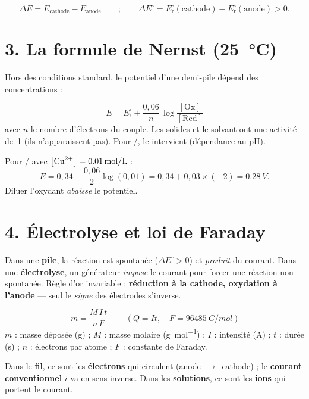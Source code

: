 \documentclass[11pt,a4paper]{article}
\newcommand{\Ered}{\ensuremath{E_{\mathrm{r}}^{\circ}}}
\newcommand{\fem}{\ensuremath{\Delta E}}
\newcommand{\cc}[1]{\left[#1\right]}
\begin{document}
\begin{formule}
\[
\fem = E_{\text{cathode}} - E_{\text{anode}} \qquad ; \qquad
\fem^{\circ} = \Ered(\text{cathode}) - \Ered(\text{anode}) > 0.
\]
\end{formule}

\section*{3. La formule de Nernst (\SI{25}{\celsius})}
Hors des conditions standard, le potentiel d'une demi-pile dépend des concentrations :
\begin{formule}
\[
E = \Ered + \frac{0{,}06}{n}\,\log\frac{[\mathrm{Ox}]}{[\mathrm{Red}]}
\]
avec $n$ le nombre d'électrons du couple. Les solides et le solvant ont une activité de~1
(ils n'apparaissent pas). Pour /, le  intervient (dépendance au pH).
\end{formule}

\begin{exemple}
Pour / avec $\cc{\ce{Cu^{2+}}}=\SI{0.01}{mol\per\litre}$ :
\[
E = 0{,}34 + \frac{0{,}06}{2}\log(0{,}01) = 0{,}34 + 0{,}03\times(-2) = \SI{0.28}{V}.
\]
Diluer l'oxydant \emph{abaisse} le potentiel.
\end{exemple}

\section*{4. Électrolyse et loi de Faraday}
\begin{regle}
Dans une \textbf{pile}, la réaction est spontanée ($\fem^{\circ}>0$) et \emph{produit} du courant.
Dans une \textbf{électrolyse}, un générateur \emph{impose} le courant pour forcer une réaction non
spontanée. Règle d'or invariable : \textbf{réduction à la cathode, oxydation à l'anode} — seul le
\emph{signe} des électrodes s'inverse.
\end{regle}

\begin{formule}
\[
\boxed{\,m = \frac{M\,I\,t}{n\,F}\,}\qquad (Q=It,\quad F=\SI{96485}{C\per mol})
\]
$m$ : masse déposée (g) ; $M$ : masse molaire (\si{g\per mol}) ; $I$ : intensité (A) ; $t$ : durée (s) ;
$n$ : électrons par atome ; $F$ : constante de Faraday.
\end{formule}

\begin{attention}
Dans le \textbf{fil}, ce sont les \textbf{électrons} qui circulent (anode~$\to$~cathode) ; le
\textbf{courant conventionnel} $i$ va en sens inverse. Dans les \textbf{solutions}, ce sont les
\textbf{ions} qui portent le courant.
\end{attention}
\end{document}
